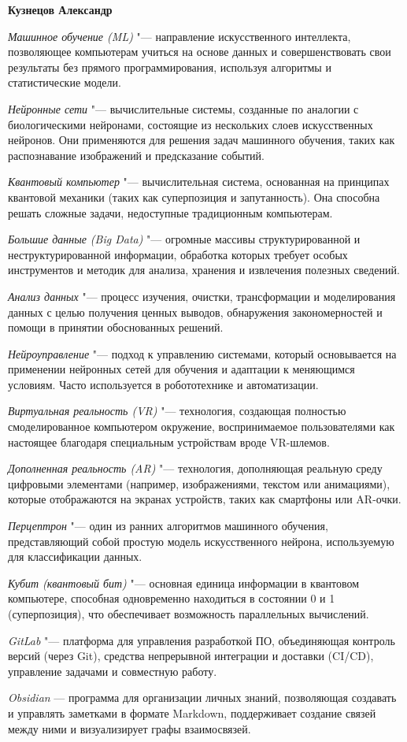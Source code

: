\documentclass{article}
\begin{document}
\begin{center}
    \textbf{Кузнецов Александр}
\end{center}

\textit{Машинное обучение (ML)} "--- направление искусственного интеллекта, позволяющее компьютерам учиться на основе данных и совершенствовать свои результаты без прямого программирования, используя алгоритмы и статистические модели.

\textit{Нейронные сети} "--- вычислительные системы, созданные по аналогии с биологическими нейронами, состоящие из нескольких слоев искусственных нейронов. Они применяются для решения задач машинного обучения, таких как распознавание изображений и предсказание событий.

\textit{Квантовый компьютер} "--- вычислительная система, основанная на принципах квантовой механики (таких как суперпозиция и запутанность). Она способна решать сложные задачи, недоступные традиционным компьютерам.

\textit{Большие данные (Big Data)} "--- огромные массивы структурированной и неструктурированной информации, обработка которых требует особых инструментов и методик для анализа, хранения и извлечения полезных сведений.

\textit{Анализ данных} "--- процесс изучения, очистки, трансформации и моделирования данных с целью получения ценных выводов, обнаружения закономерностей и помощи в принятии обоснованных решений.

\textit{Нейроуправление} "--- подход к управлению системами, который основывается на применении нейронных сетей для обучения и адаптации к меняющимся условиям. Часто используется в робототехнике и автоматизации.

\textit{Виртуальная реальность (VR)} "--- технология, создающая полностью смоделированное компьютером окружение, воспринимаемое пользователями как настоящее благодаря специальным устройствам вроде VR-шлемов.

\textit{Дополненная реальность (AR)} "--- технология, дополняющая реальную среду цифровыми элементами (например, изображениями, текстом или анимациями), которые отображаются на экранах устройств, таких как смартфоны или AR-очки.

\textit{Перцептрон} "--- один из ранних алгоритмов машинного обучения, представляющий собой простую модель искусственного нейрона, используемую для классификации данных.

\textit{Кубит (квантовый бит)} "--- основная единица информации в квантовом компьютере, способная одновременно находиться в состоянии 0 и 1 (суперпозиция), что обеспечивает возможность параллельных вычислений.

\textit{GitLab} "--- платформа для управления разработкой ПО, объединяющая контроль версий (через Git), средства непрерывной интеграции и доставки (CI/CD), управление задачами и совместную работу.

\textit{Obsidian} — программа для организации личных знаний, позволяющая создавать и управлять заметками в формате Markdown, поддерживает создание связей между ними и визуализирует графы взаимосвязей.
\end{document}
